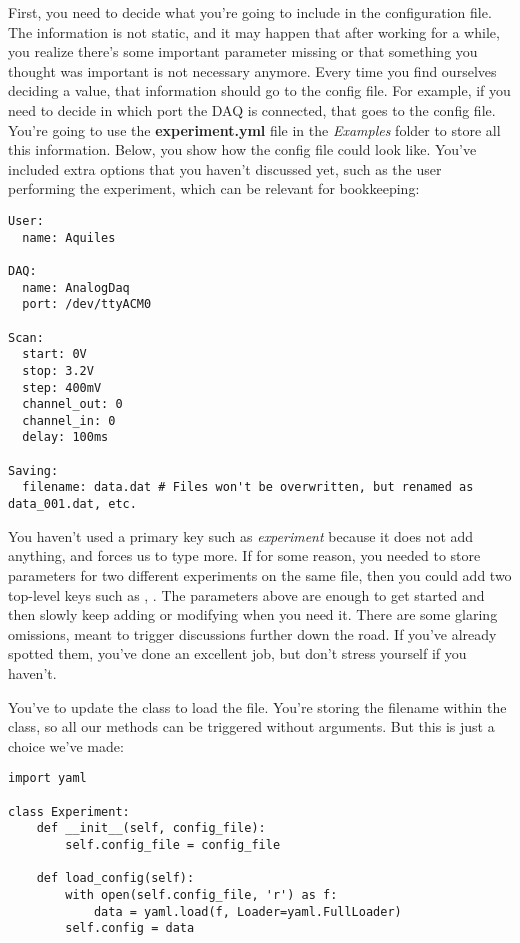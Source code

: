 First, you need to decide what you're going to include in the configuration file. The information is not static, and it may happen that after working for a while, you realize there's some important parameter missing or that something you thought was important is not necessary anymore. Every time you find ourselves deciding a value, that information should go to the config file. For example, if you need to decide in which port the DAQ is connected, that goes to the config file. You're going to use the \textbf{experiment.yml} file in the \emph{Examples} folder to store all this information. Below, you show how the config file could look like. You've included extra options that you haven't discussed yet, such as the user performing the experiment, which can be relevant for bookkeeping:

\begin{verbatim}
User:
  name: Aquiles

DAQ:
  name: AnalogDaq
  port: /dev/ttyACM0

Scan:
  start: 0V
  stop: 3.2V
  step: 400mV
  channel_out: 0
  channel_in: 0
  delay: 100ms

Saving:
  filename: data.dat # Files won't be overwritten, but renamed as data_001.dat, etc.
\end{verbatim}

You haven't used a primary key such as \emph{experiment} because it does not add anything, and forces us to type more. If for some reason, you needed to store parameters for two different experiments on the same file, then you could add two top-level keys such as , . The parameters above are enough to get started and then slowly keep adding or modifying when you need it. There are some glaring omissions, meant to trigger discussions further down the road. If you've already spotted them, you've done an excellent job, but don't stress yourself if you haven't.

You've to update the  class to load the file. You're storing the filename within the class, so all our methods can be triggered without arguments. But this is just a choice we've made:

\begin{verbatim}
import yaml

class Experiment:
    def __init__(self, config_file):
        self.config_file = config_file

    def load_config(self):
        with open(self.config_file, 'r') as f:
            data = yaml.load(f, Loader=yaml.FullLoader)
        self.config = data
\end{verbatim}

